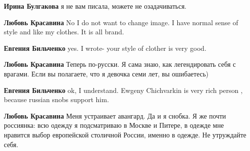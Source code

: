 \begin{itemize}
\begin{itemize}
 
\textbf{Ирина Булгакова} я не вам писала, можете не озадачиваться.

 
\textbf{Любовь Красавина} No I do not want to change image. I have normal sense of style and like my clothes. It is all brand.

 
\textbf{Евгения Бильченко} yes. I wrote- your style of clother is very good.

 
\textbf{Любовь Красавина} Теперь по-русски. Я сама знаю, как легендировать себя с врагами. Если вы полагаете, что я девочка семи лет, вы ошибаетесь)

 
\textbf{Евгения Бильченко} ok, I understand. Ewgeny Chichvarkin is very rich person , because russian snobs support him.

 
\textbf{Любовь Красавина} Меня устраивает авангард. Да и я снобка. Я же почти россиянка: всю одежду я подсматриваю в Москве и Питере, в одежде мне нравится выбор европейской столичной России, именно в одежде. Не утруждайте себя.


\end{itemize}
\end{itemize}
